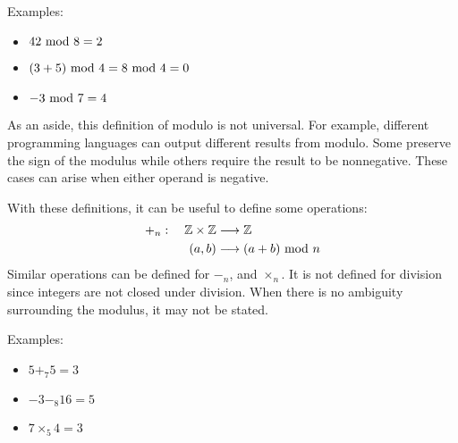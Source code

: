 Examples:
\begin{itemize}
    \item \(42 \text{ mod } 8=2\)
    \item \((3+5)\text{ mod } 4=8\text{ mod } 4=0\)
    \item \(-3\text{ mod } 7=4\)
\end{itemize}

As an aside, this definition of modulo is not universal. For example, different programming languages can output different results from modulo. Some preserve the sign of the modulus 
while others require the result to be nonnegative. These cases can arise when either operand is negative. 

With these definitions, it can be useful to define some operations:
\[\begin{aligned}
    +_n:\quad\mathbb{Z}\times\mathbb{Z}&\longrightarrow\mathbb{Z}\\
                                 (a,b) &\longrightarrow (a+b)\text{ mod } n
\end{aligned}\]
Similar operations can be defined for \(-_n\), and \(\times_n\). It is not defined for division since integers are not closed under division. When there is no ambiguity surrounding the modulus, 
it may not be stated.

Examples:
\begin{itemize}
    \item \(5+_7 5=3\)
    \item \(-3-_8 16=5\)
    \item \(7\times_5 4=3\)
\end{itemize}
